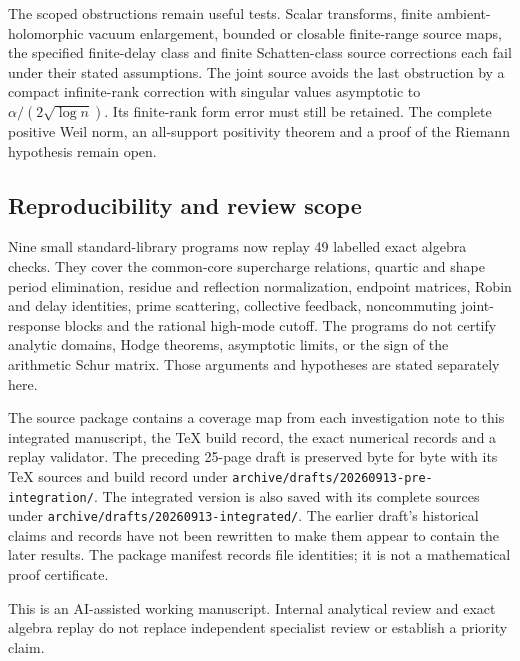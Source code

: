 The scoped obstructions remain useful tests. Scalar transforms,
finite ambient-holomorphic vacuum enlargement, bounded or
closable finite-range source maps, the specified finite-delay
class and finite Schatten-class source corrections each fail
under their stated assumptions. The joint source avoids the
last obstruction by a compact infinite-rank correction with
singular values asymptotic to $\alpha/(2\sqrt{\log n})$.
Its finite-rank form error must still be retained.
The complete positive Weil norm, an all-support positivity
theorem and a proof of the Riemann hypothesis remain open.

\subsection{Reproducibility and review scope}
Nine small standard-library programs now replay 49 labelled
exact algebra checks. They cover the common-core supercharge
relations, quartic and shape period elimination, residue and
reflection normalization, endpoint matrices, Robin and delay
identities, prime scattering, collective feedback, noncommuting
joint-response blocks and the rational high-mode cutoff.
The programs do not certify analytic domains, Hodge theorems,
asymptotic limits, or the sign of the arithmetic Schur matrix.
Those arguments and hypotheses are stated separately here.

The source package contains a coverage map from each investigation
note to this integrated manuscript, the TeX build record,
the exact numerical records and a replay validator.
The preceding 25-page draft is preserved byte for byte with
its TeX sources and build record under
\texttt{archive/drafts/20260913-pre-integration/}.
The integrated version is also saved with its complete sources under
\texttt{archive/drafts/20260913-integrated/}.
The earlier draft's historical claims and records have not been rewritten to
make them appear to contain the later results.
The package manifest records file identities; it is not a
mathematical proof certificate.

This is an AI-assisted working manuscript. Internal analytical
review and exact algebra replay do not replace independent
specialist review or establish a priority claim.
